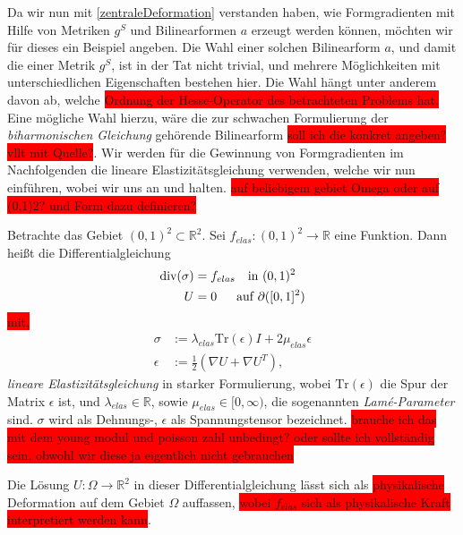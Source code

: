Da wir nun mit \ref{zentraleDeformation} verstanden haben, wie Formgradienten mit Hilfe von Metriken $g^S$ und Bilinearformen $a$ erzeugt werden können, möchten wir für dieses ein Beispiel angeben. Die Wahl einer solchen Bilinearform $a$, und damit die einer Metrik $g^S$, ist in der Tat nicht trivial, und mehrere Möglichkeiten mit unterschiedlichen Eigenschaften bestehen hier. Die Wahl hängt unter anderem davon ab, welche \colorbox{red}{Ordnung der Hesse-Operator des betrachteten Problems hat.} Eine mögliche Wahl hierzu, wäre die zur schwachen Formulierung der \textit{biharmonischen Gleichung} gehörende Bilinearform \colorbox{red}{soll ich die konkret angeben? vllt mit Quelle?}. Wir werden für die Gewinnung von Formgradienten im Nachfolgenden die lineare Elastizitätsgleichung verwenden, welche wir nun einführen, wobei wir uns an \cite{bfgs1} und \cite{bfgs2} halten. \colorbox{red}{auf beliebigem gebiet Omega oder auf (0,1)2? und Form dazu definieren?}

\begin{defi}
	Betrachte das Gebiet $(0,1)^2 \subset \mathbb{R}^2$. Sei $f_{elas}: (0,1)^2 \rightarrow \mathbb{R}$ eine Funktion. Dann heißt die Differentialgleichung
	\begin{equation}\label{linelas}
		\begin{aligned}
		\text{div}(\sigma) &= f_{elas} \quad \text{in } (0,1)^2 \\
		U &= 0 \quad \hspace{0.2cm} \text{auf } \partial([0,1]^2)
		\end{aligned}
	\end{equation}	 
	\colorbox{red}{mit,}
	\begin{align*}
		\sigma &:= \lambda_{elas} \text{Tr}(\epsilon)I + 2\mu_{elas}\epsilon \\
		\epsilon &:= \frac{1}{2}(\nabla U + \nabla U^T),
	\end{align*}
	\textit{lineare Elastizitätsgleichung} in starker Formulierung, wobei $\text{Tr}(\epsilon)$ die Spur der Matrix $\epsilon$ ist, und $\lambda_{elas} \in \mathbb{R}$, sowie $\mu_{elas} \in [0,\infty)$, die sogenannten \textit{Lamé-Parameter} sind. $\sigma$ wird als Dehnungs-, $\epsilon$ als Spannungstensor bezeichnet. \colorbox{red}{brauche ich das mit dem young modul und poisson zahl unbedingt? oder sollte ich vollständig sein, obwohl wir diese ja eigentlich nicht gebrauchen}
\end{defi}

Die Lösung $U: \Omega \rightarrow \mathbb{R}^2$ in dieser Differentialgleichung lässt sich als \colorbox{red}{physikalische} Deformation auf dem Gebiet $\Omega$ auffassen, \colorbox{red}{wobei $f_{elas}$ sich als physikalische Kraft interpretiert werden kann}. 

